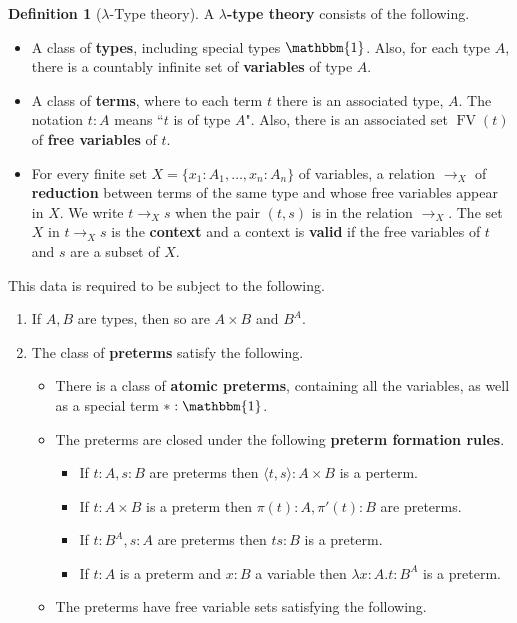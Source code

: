 \documentclass[12pt]{article}
\theoremstyle{plain}
\theoremstyle{definition}
\newtheorem{defn}[thm]{Definition} %
\newcommand{\lto}{\longrightarrow}
\begin{document}
	\begin{defn}[$\lambda$-Type theory]\label{def:lambda_type_theory}
		A \textbf{$\lambda$-type theory} consists of the following.
		\begin{itemize}
			\item A class of \textbf{types}, including special types $\mathbbm{1}$. Also, for each type $A$, there is a countably infinite set of \textbf{variables} of type $A$.
			\item A class of \textbf{terms}, where to each term $t$ there is an associated type, $A$. The notation $t:A$ means ``$t$ is of type $A$". Also, there is an associated set $\operatorname{FV}(t)$ of \textbf{free variables} of $t$.
			\item For every finite set $X = \{ x_1:A_1, \ldots, x_n:A_n \}$ of variables, a relation $\lto_X$ of \textbf{reduction} between terms of the same type and whose free variables appear in $X$. We write $t \lto_X s$ when the pair $(t,s)$ is in the relation $\lto_X$. The set $X$ in $t\lto_X s$ is the \textbf{context} and a context is \textbf{valid} if the free variables of $t$ and $s$ are a subset of $X$.
			\end{itemize}
		This data is required to be subject to the following.
		\begin{enumerate}
			\item If $A, B$ are types, then so are $A \times B$ and $B^A$.
			\item The class of \textbf{preterms} satisfy the following.
			\begin{itemize}
				\item There is a class of \textbf{atomic preterms}, containing all the variables, as well as a special term $\ast: \mathbbm{1}$.
				\item The preterms are closed under the following \textbf{preterm formation rules}.
				\begin{itemize}
					\item If $t:A, s:B$ are preterms then $\langle t, s \rangle: A \times B$ is a perterm.
					\item If $t: A \times B$ is a preterm then $\pi(t): A, \pi'(t): B$ are preterms.
					\item If $t: B^A, s:A$ are preterms then $ts: B$ is a preterm.
					\item If $t: A$ is a preterm and $x:B$ a variable then $\lambda x:A. t: B^A$ is a preterm.
					\end{itemize}
				\item The preterms have free variable sets satisfying the following.

\end{itemize}
\end{enumerate}
\end{defn}
\end{document}

